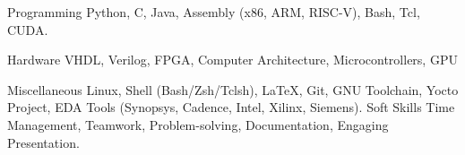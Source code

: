 

\begin{cvskills}

  \cvskill
    {Programming} %
    {Python, C, Java, Assembly (x86, ARM, RISC-V), Bash, Tcl, CUDA.} %
    
  \cvskill
    {Hardware} %
    {VHDL, Verilog, FPGA, Computer Architecture, Microcontrollers, GPU} %

  \cvskill
    {Miscellaneous} %
    {Linux, Shell (Bash/Zsh/Tclsh), \LaTeX, Git, GNU Toolchain, Yocto Project, EDA Tools (Synopsys, Cadence, Intel, Xilinx, Siemens).} %
  \cvskill
    {Soft Skills} %
    {Time Management, Teamwork, Problem-solving, Documentation, Engaging Presentation.} %

\end{cvskills}

